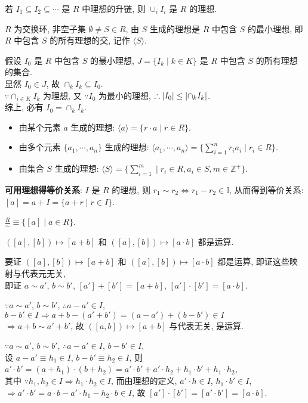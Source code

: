 \documentclass{note}
\begin{document}
\begin{thm}
    若 $I_1\subseteq I_2\subseteq\cdots$ 是 $R$ 中理想的升链, 则 $\cup_iI_i$ 是 $R$ 的理想.
\end{thm}

\begin{df}[生成理想]
    $R$ 为交换环, 非空子集 $\emptyset\neq S\in R$, 由 $S$ 生成的理想是 $R$ 中包含 $S$ 的最小理想, 即 $R$ 中包含 $S$ 的所有理想的交, 记作 $\langle S\rangle$.
\end{df}
\begin{pf}
    假设 $I_0$ 是 $R$ 中包含 $S$ 的最小理想, $J=\{I_k\mid k\in K\}$ 是 $R$ 中包含 $S$ 的所有理想的集合.\\
    显然 $I_0\in J$, 故 $\cap_kI_k\subseteq I_0$.\\
    $\because\cap_{i\in K}I_k$ 为理想, 又 $\because I_0$ 为最小的理想, $\therefore\left\lvert I_0\right\rvert\leq\left\lvert\cap_kI_k\right\rvert$.\\
    综上, 必有 $I_0=\cap_kI_k$.
\end{pf}

\begin{itemize}
    \item 由某个元素 $a$ 生成的理想: $\langle a\rangle=\{r\cdot a\mid r\in R\}$.
    \item 由多个元素 $\{a_1,\cdots,a_n\}$ 生成的理想: $\langle a_1,\cdots,a_n\rangle=\{\sum_{i=1}^nr_ia_i\mid r_i\in R\}$.
    \item 由集合 $S$ 生成的理想: $\langle S\rangle=\{\sum_{i=1}^m\mid r_i\in R,a_i\in S,m\in\mathbb{Z}^+\}$.
\end{itemize}

\textbf{可用理想得等价关系}: $I$ 是 $R$ 的理想, 则 $r_1\sim r_2\Longleftrightarrow r_1-r_2\in\mathbb{I}$, 从而得到等价关系: $[a]=a+I=\{a+r\mid r\in I\}$.

\begin{df}[商环]
    $\frac{R}{\sim}\equiv\{[a]\mid a\in R\}$.
\end{df}

$([a],[b])\mapsto[a+b]$ 和 $([a],[b])\mapsto[a\cdot b]$ 都是运算.
\begin{pf}
    要证 $([a],[b])\mapsto[a+b]$ 和 $([a],[b])\mapsto[a\cdot b]$ 都是运算, 即证这些映射与代表元无关,\\
    即证 $a\sim a'$, $b\sim b'$, $[a']+[b']=[a+b]$, $[a']\cdot[b']=[a\cdot b]$.

    $\because a\sim a'$, $b\sim b'$, $\therefore a-a'\in I$, $b-b'\in I\Longrightarrow a+b-(a'+b')=(a-a')+(b-b')\in I$\\
    $\Longrightarrow a+b\sim a'+b'$, 故 $([a,b])\mapsto[a+b]$ 与代表无关, 是运算.

    $\because a\sim a'$, $b\sim b'$, $\therefore a-a'\in I$, $b-b'\in I$,\\
    设 $a-a'\equiv h_1\in I$, $b-b'\equiv h_2\in I$, 则 $a'\cdot b'=(a+h_1)\cdot(b+h_2)=a'\cdot b'+a'\cdot h_2+h_1\cdot b'+h_1\cdot h_2$,\\
    其中 $\because h_1,h_2\in I\Longrightarrow h_1\cdot h_2\in I$, 而由理想的定义, $a'\cdot h\in I$, $h_1\cdot b'\in I$,\\
    $\Longrightarrow a'\cdot b'=a\cdot b-a'\cdot h_1-h_2\cdot b\in I$, 故 $[a']\cdot[b']=[a'\cdot b']=[a\cdot b]$.
\end{pf}
\end{document}
